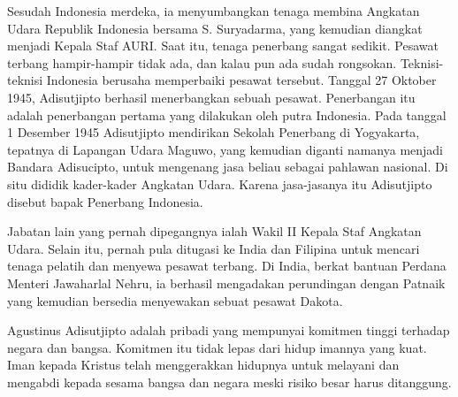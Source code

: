 Sesudah Indonesia merdeka, ia menyumbangkan tenaga membina Angkatan Udara Republik Indonesia bersama S. Suryadarma, yang kemudian diangkat menjadi Kepala Staf AURI. Saat itu, tenaga penerbang sangat sedikit. Pesawat terbang hampir-hampir tidak ada, dan kalau pun ada sudah rongsokan. Teknisi-teknisi Indonesia berusaha memperbaiki pesawat tersebut. Tanggal 27 Oktober 1945, Adisutjipto berhasil menerbangkan sebuah pesawat. Penerbangan itu adalah penerbangan pertama yang dilakukan oleh putra Indonesia. Pada tanggal 1 Desember 1945 Adisutjipto mendirikan Sekolah Penerbang di Yogyakarta, tepatnya di Lapangan Udara Maguwo, yang kemudian diganti namanya menjadi Bandara Adisucipto, untuk mengenang jasa beliau sebagai pahlawan nasional. Di situ dididik kader-kader Angkatan Udara. Karena jasa-jasanya itu Adisutjipto disebut bapak Penerbang Indonesia.

Jabatan lain yang pernah dipegangnya ialah Wakil II Kepala Staf Angkatan Udara. Selain itu, pernah pula ditugasi ke India dan Filipina untuk mencari tenaga pelatih dan menyewa pesawat terbang. Di India, berkat bantuan Perdana Menteri Jawaharlal Nehru, ia berhasil mengadakan perundingan dengan Patnaik yang kemudian bersedia menyewakan sebuat pesawat Dakota.

Agustinus Adisutjipto adalah pribadi yang mempunyai komitmen tinggi terhadap negara dan bangsa. Komitmen itu tidak lepas dari hidup imannya yang kuat. Iman kepada Kristus telah menggerakkan hidupnya untuk melayani dan mengabdi kepada sesama bangsa dan negara meski risiko besar harus ditanggung.

